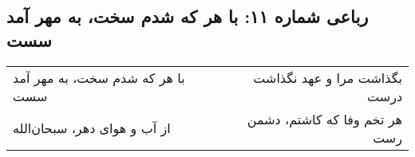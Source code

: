 \begin{center}
\section*{رباعی شماره ۱۱: با هر که شدم سخت، به مهر آمد سست}
\label{sec:011}
\begin{longtable}{l p{0.5cm} r}
با هر که شدم سخت، به مهر آمد سست
&&
بگذاشت مرا و عهد نگذاشت درست
\\
از آب و هوای دهر، سبحان‌الله
&&
هر تخم وفا که کاشتم، دشمن رست
\\
\end{longtable}
\end{center}
